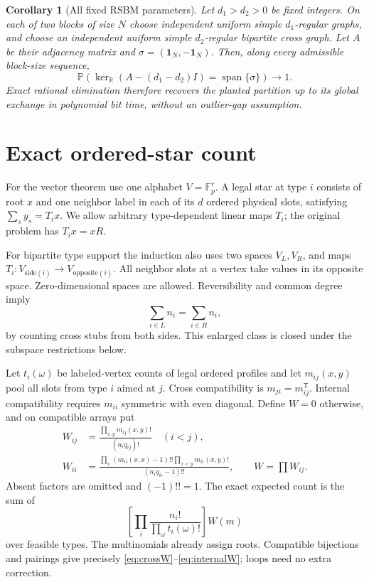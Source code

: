 \documentclass[11pt]{article}
\newtheorem{corollary}{Corollary}
\newcommand{\Fp}{\mathbb F_p}
\newcommand{\Prob}{\mathbb P}
\newcommand{\one}{\mathbf1}
\begin{document}
\begin{corollary}[All fixed RSBM parameters]\label{cor:rsbm}
Let $d_1>d_2>0$ be fixed integers. On each of two blocks of size $N$ choose independent uniform simple $d_1$-regular graphs, and choose an independent uniform simple $d_2$-regular bipartite cross graph. Let $A$ be their adjacency matrix and $\sigma=(\one_N,-\one_N)$. Then, along every admissible block-size sequence,
\[
 \Prob\!\left(\ker_{\mathbb R}(A-(d_1-d_2)I)
                   =\operatorname{span}\{\sigma\}\right)\longrightarrow1.
\]
Exact rational elimination therefore recovers the planted partition up to its global exchange in polynomial bit time, without an outlier-gap assumption.
\end{corollary}

\section{Exact ordered-star count}
For the vector theorem use one alphabet $V=\Fp^r$. A legal star at type $i$ consists of root $x$ and one neighbor label in each of its $d$ ordered physical slots, satisfying $\sum_s y_s=T_i x$. We allow arbitrary type-dependent linear maps $T_i$; the original problem has $T_i x=xR$.

For bipartite type support the induction also uses two spaces $V_L,V_R$, and maps $T_i:V_{\mathrm{side}(i)}\to V_{\mathrm{opposite}(i)}$. All neighbor slots at a vertex take values in its opposite space. Zero-dimensional spaces are allowed. Reversibility and common degree imply
\begin{equation}\label{eq:sides}
 \sum_{i\in L}n_i=\sum_{i\in R}n_i,
\end{equation}
by counting cross stubs from both sides. This enlarged class is closed under the subspace restrictions below.

Let $t_i(\omega)$ be labeled-vertex counts of legal ordered profiles and let $m_{ij}(x,y)$ pool all slots from type $i$ aimed at $j$. Cross compatibility is $m_{ji}=m_{ij}^{\mathsf T}$. Internal compatibility requires $m_{ii}$ symmetric with even diagonal. Define $W=0$ otherwise, and on compatible arrays put
\begin{align}
 W_{ij}&=\frac{\prod_{x,y}m_{ij}(x,y)!}{(n_iq_{ij})!}\quad(i<j),\label{eq:crossW}\\
 W_{ii}&=\frac{\prod_x(m_{ii}(x,x)-1)!!\prod_{x<y}m_{ii}(x,y)!}
 {(n_iq_{ii}-1)!!},\qquad W=\prod W_{ij}.\label{eq:internalW}
\end{align}
Absent factors are omitted and $(-1)!!=1$. The exact expected count is the sum of
\begin{equation}\label{eq:typecount}
 \left[\prod_i\frac{n_i!}{\prod_\omega t_i(\omega)!}\right]W(m)
\end{equation}
over feasible types. The multinomials already assign roots. Compatible bijections and pairings give precisely \eqref{eq:crossW}--\eqref{eq:internalW}; loops need no extra correction.
\end{document}

